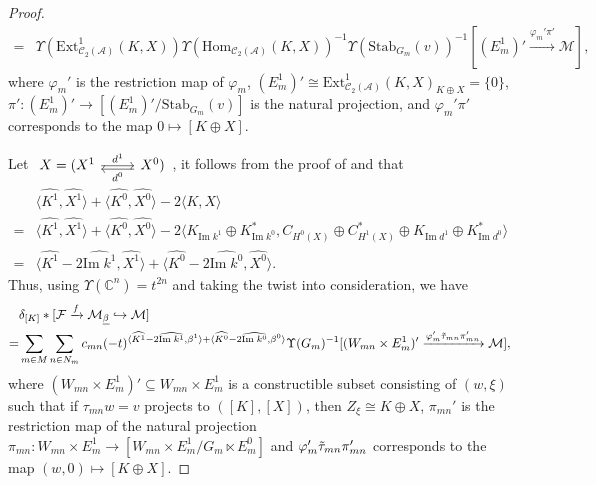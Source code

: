 \documentclass[12pt]{amsart}
\theoremstyle{definition}
\numberwithin{equation}{section}
\begin{document}
\begin{proof}
\begin{align*}
    =&  \Upsilon(\mathrm{Ext}^1_{\mathcal{C}_2(\mathcal{A})}(K,X))\Upsilon(\mathrm{Hom}_{\mathcal{C}_2(\mathcal{A})}(K, X))^{-1}\Upsilon(\mathrm{Stab}_{G_m}(v))^{-1}[(E_m^1)' \xrightarrow{\varphi_m'\pi'} \mathcal{M}],
\end{align*}
where $ \varphi_m' $ is the restriction map of $ \varphi_m $, $ (E_m^1)' \cong \mathrm{Ext}^1_{\mathcal{C}_2(\mathcal{A})}(K,X)_{K \oplus X} =\{0\} $, $ \pi': (E_m^1)' \to[(E_m^1)'/\mathrm{Stab}_{G_m}(v)] $ is the natural projection, and $ \varphi_m'\pi' $ corresponds to the map $ 0 \mapsto [K \oplus X] $.

Let $\begin{tikzcd} X = (X^1 \arrow[r,"d^1"] & X^0) \arrow[l, shift left,"d^0"] \end{tikzcd}$, it follows from the proof of \cite[Proposition 3.12]{LP21} and \cite[Proposition 2.4, Corollary 2.5]{LP21} that
    \begin{align*}
    &\langle \widehat{K^1},\widehat{X^1} \rangle + \langle \widehat{K^0},\widehat{X^0} \rangle - 2 \langle K,X \rangle \\
    =& \langle \widehat{K^1},\widehat{X^1} \rangle + \langle \widehat{K^0},\widehat{X^0} \rangle - 2 \langle K_{\mathrm{Im}\;k^1} \oplus K_{\mathrm{Im}\;k^0}^*,C_{H^0(X)} \oplus C_{H^1(X)}^* \oplus K_{\mathrm{Im}\;d^1} \oplus K_{\mathrm{Im}\;d^0}^* \rangle \\
    =& \langle \widehat{K^1} - 2 \widehat{\mathrm{Im}\;k^1},\widehat{X^1} \rangle + \langle \widehat{K^0} - 2 \widehat{\mathrm{Im}\;k^0},\widehat{X^0} \rangle.
\end{align*}
Thus, using $ \Upsilon(\mathbb{C}^n) = t^{2n} $ and taking the twist into consideration, we have
\begin{align*}
    &\delta_{[K]} * [\mathcal{F} \xrightarrow{f} \mathcal{M}_{\underline{\beta}} \hookrightarrow \mathcal{M} ] \\
    =& \sum_{m \in M}\sum_{n \in N_m}c_{mn}(-t)^{\langle \widehat{K^1} - 2 \widehat{\mathrm{Im}\;k^1},\beta^1 \rangle + \langle \widehat{K^0} - 2 \widehat{\mathrm{Im}\;k^0},\beta^0 \rangle}\Upsilon(G_m)^{-1} [(W_{mn} \times E_m^1)' \xrightarrow{\varphi_m' \Tilde{\tau}_{mn} \pi_{mn}'} \mathcal{M}] ,
\end{align*}
where $ (W_{mn} \times E_m^1)' \subseteq W_{mn} \times E_m^1 $ is a constructible subset consisting of $ (w,\xi) $ such that if $ \tau_{mn} w = v $ projects to $ ([K],[X]) $, then $ Z_{\xi} \cong K \oplus X $, $ \pi_{mn}' $ is the restriction map of the natural projection $ \pi_{mn}:  W_{mn} \times E_m^1 \to [W_{mn} \times E_m^1/G_m \ltimes E_m^0]  $ and $ \varphi_m' \Tilde{\tau}_{mn} \pi_{mn}' $ corresponds to the map $ (w,0) \mapsto [K \oplus X] $.


\end{proof}
\end{document}
